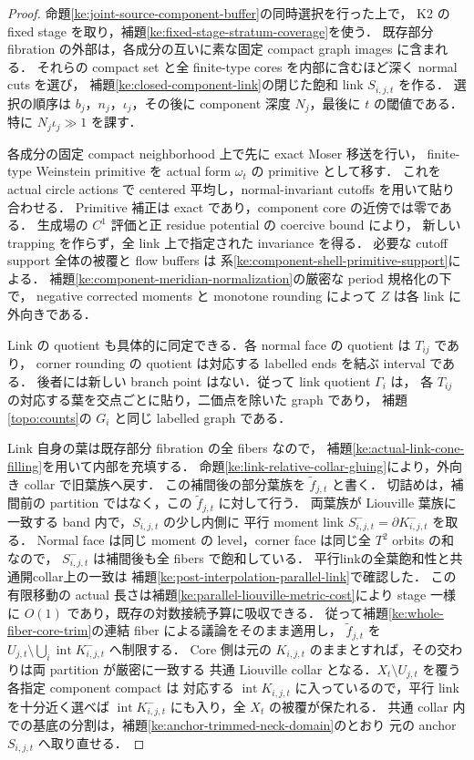 \begin{proof}
命題\ref{ke:joint-source-component-buffer}の同時選択を行った上で，
K2 の fixed stage を取り，補題\ref{ke:fixed-stage-stratum-coverage}を使う．
既存部分 fibration の外部は，各成分の互いに素な固定 compact graph images に含まれる．
それらの compact set と全 finite-type cores を内部に含むほど深く normal cuts を選び，
補題\ref{ke:closed-component-link}の閉じた飽和 link $S_{i,j,t}$ を作る．
選択の順序は $b_j$，$n_j$，$\iota_j$，その後に component 深度 $N_j$，最後に $t$ の閾値である．
特に $N_j\iota_j\gg1$ を課す．

各成分の固定 compact neighborhood 上で先に exact Moser 移送を行い，
finite-type Weinstein primitive を actual form $\omega_t$ の primitive として移す．
これを actual circle actions で centered 平均し，normal-invariant cutoffs を用いて貼り合わせる．
Primitive 補正は exact であり，component core の近傍では零である．
生成場の $C^1$ 評価と正 residue potential の coercive bound により，
新しい trapping を作らず，全 link 上で指定された invariance を得る．
必要な cutoff support 全体の被覆と flow buffers は
系\ref{ke:component-shell-primitive-support}による．
補題\ref{ke:component-meridian-normalization}の厳密な period 規格化の下で，
negative corrected moments と monotone rounding によって $Z$ は各 link に外向きである．

Link の quotient も具体的に同定できる．各 normal face の quotient は $T_{ij}$ であり，
corner rounding の quotient は対応する labelled ends を結ぶ interval である．
後者には新しい branch point はない．従って link quotient $\Gamma_i$ は，
各 $T_{ij}$ の対応する葉を交点ごとに貼り，二価点を除いた graph であり，
補題\ref{topo:counts}の $G_i$ と同じ labelled graph である．

Link 自身の葉は既存部分 fibration の全 fibers なので，
補題\ref{ke:actual-link-cone-filling}を用いて内部を充填する．
命題\ref{ke:link-relative-collar-gluing}により，外向き collar で旧葉族へ戻す．
この補間後の部分葉族を $\widetilde f_{j,t}$ と書く．
切詰めは，補間前の partition ではなく，この $\widetilde f_{j,t}$ に対して行う．
両葉族が Liouville 葉族に一致する band 内で，$S_{i,j,t}$ の少し内側に
平行 moment link $S^-_{i,j,t}=\partial K^-_{i,j,t}$ を取る．
Normal face は同じ moment の level，corner face は同じ全 $T^2$ orbits の和なので，
$S^-_{i,j,t}$ は補間後も全 fibers で飽和している．
平行linkの全葉飽和性と共通開collar上の一致は
補題\ref{ke:post-interpolation-parallel-link}で確認した．
この有限移動の actual 長さは補題\ref{ke:parallel-liouville-metric-cost}により
stage 一様に $O(1)$ であり，既存の対数接続予算に吸収できる．
従って補題\ref{ke:whole-fiber-core-trim}の連結 fiber による議論をそのまま適用し，
$\widetilde f_{j,t}$ を
$U_{j,t}\setminus\bigcup_i\operatorname{int}K^-_{i,j,t}$ へ制限する．
Core 側は元の $K_{i,j,t}$ のままとすれば，その交わりは両 partition が厳密に一致する
共通 Liouville collar となる．$X_t\setminus U_{j,t}$ を覆う各指定 component compact は
対応する $\operatorname{int}K_{i,j,t}$ に入っているので，平行 link を十分近く選べば
$\operatorname{int}K^-_{i,j,t}$ にも入り，全 $X_t$ の被覆が保たれる．
共通 collar 内での基底の分割は，補題\ref{ke:anchor-trimmed-neck-domain}のとおり
元の anchor $S_{i,j,t}$ へ取り直せる．


\end{proof}
